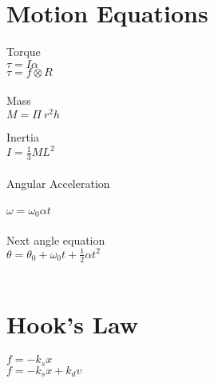 \section{Motion Equations}

Torque\\
$ \tau = I\alpha $ \\
$ \tau = f \otimes R $ \\
\\
Mass \\
$ M = \Pi~ r ^ 2 h $ 

Inertia\\
$ I = \frac{1}{3} M L ^ 2 $ \\ 
\\
Angular Acceleration\\
\\
$ \omega = \omega _0 \alpha t $ \\
\\
Next angle equation\\
$ \theta = \theta _0 + \omega _0 t + \frac{1}{2} \alpha t ^2 $ \\
\\

\section{Hook's Law}

$ f = -k _s x $\\
$ f = -k _s x + k _d v $\\